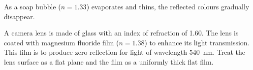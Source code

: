 \documentclass[12pt]{../../ossphysics}
\begin{document}
\begin{questions}
  \question As a soap bubble ($n=1.33$) evaporates and thins, the reflected
  colours gradually disappear.
  \vspace{\stretch1}

  \question A camera lens is made of glass with an index of refraction of 1.60.
  The lens is coated with magnesium fluoride film ($n=1.38$) to enhance its
  light transmission. This film is to produce zero reflection for light of
  wavelength \SI{540}{\nano\metre}. Treat the lens surface as a flat plane and
  the film as a uniformly thick flat film.
  \vspace{\stretch1}
    
\end{questions}
\end{document}
